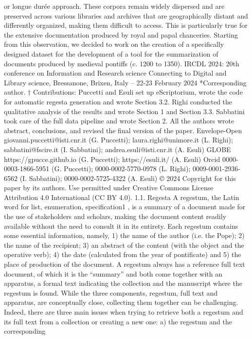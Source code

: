 {or longue durée approach. These corpora remain widely dispersed and are preserved across various
libraries and archives that are geographically distant and differently organized, making them difficult to
access. This is particularly true for the extensive documentation produced by royal and papal chanceries.
Starting from this observation, we decided to work on the creation of a specifically designed dataset for
the development of a tool for the summarization of documents produced by medieval pontiffs (c. 1200
to 1350).
IRCDL 2024: 20th conference on Information and Research science Connecting to Digital and Library science, Bressanone, Brixen,
Italy – 22-23 February 2024
*Corresponding author.
†
Contributions: Puccetti and Esuli set up eScriptorium, wrote the code for automatic regesta generation and wrote Section 3.2.
Righi conducted the qualitative analysis of the results and wrote Section 1 and Section 3.3. Sabbatini took care of the full
data pipeline and wrote Section 2. All the authors wrote abstract, conclusions, and revised the final version of the paper.
Envelope-Open giovanni.puccetti@isti.cnr.it (G. Puccetti); laura.righi@unimore.it (L. Righi); sabbatini@fscire.it (I. Sabbatini);
andrea.esuli@isti.cnr.it (A. Esuli)
GLOBE https://gpucce.github.io (G. Puccetti); https://esuli.it/ (A. Esuli)
Orcid 0000-0003-1866-5951 (G. Puccetti); 0000-0002-5770-0978 (L. Righi); 0009-0001-2936-6562 (I. Sabbatini);
0000-0002-5725-4322 (A. Esuli)
© 2024 Copyright for this paper by its authors. Use permitted under Creative Commons License Attribution 4.0 International (CC BY 4.0).
1.1. Regesta
A regestum, the Latin word for list, enumeration, specification1
, is a summary of a document made for
the use of stakeholders and scholars, making the document content readily available without the need
to consult it in its entirety. Each regestum contains some essential information, namely, 1) the name of
the author (i.e. the Pope); 2) the name of the recipient; 3) an abstract of the content (with the object and
the operative verb); 4) the date (calculated from the year of pontificate) and 5) the place of production
of the document. A regestum always has a reference full text document, of which it is the “summary”
and both come together with an apparatus, a formal text indicating the collection and the manuscript
where the regestum is found.
While the three components, regestum, full text and apparatus, are conceptually close, collecting
them together can be challenging. Indeed, there are three main issues when trying to retrieve both a
regestum and its full text from a collection or creating a new one: a) the regestum and the corresponding
}
